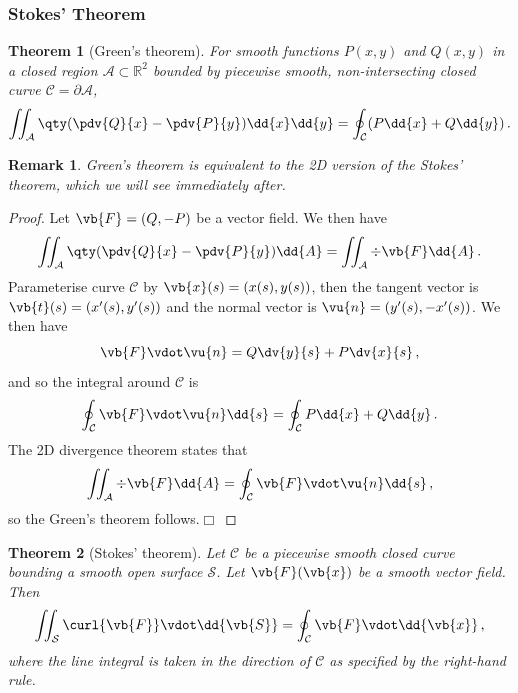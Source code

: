 \documentclass{article}
\theoremstyle{plain}\theoremheaderfont{\normalfont\itshape}\theorembodyfont{\rmfamily}\theoremseparator{.}\newtheorem*{rem}{Remark}\newtheorem*{ex}{Example}\newtheorem*{proof}{Proof}\newtheorem*{altp}{Alternative proof}
\theoremstyle{plain}\theoremheaderfont{\normalfont\bfseries}\theorembodyfont{\rmfamily}\theoremseparator{.}\newtheorem{thm}{Theorem}[section]\newtheorem{lem}[thm]{Lemma}\newtheorem{prop}[thm]{Proposition}\newtheorem*{cor}{Corollary}\newtheorem{defn}[thm]{Definition}\newtheorem{clm}[thm]{Claim}\newtheorem{clminproof}{Claim}
\theoremstyle{break}\theoremheaderfont{\normalfont\itshape}\theorembodyfont{\rmfamily}\theoremseparator{.\medskip}\newtheorem*{proofskip}{Proof}\newtheorem*{exs}{Examples}\newtheorem*{rems}{Remarks}
\theoremstyle{break}\theoremheaderfont{\normalfont\bfseries}\theorembodyfont{\rmfamily}\theoremseparator{.\medskip}\newtheorem{lemskip}[thm]{Lemma}\newtheorem{defnskip}[thm]{Definition}\newtheorem{propskip}[thm]{Proposition}\newtheorem{thmskip}[thm]{Theorem}
\numberwithin{equation}{section}
\newcommand{\qed}{\hfill\ensuremath{\Box}}
\begin{document}
	\subsubsection{Stokes' Theorem}	
	\begin{thm}[Green's theorem]	
		For smooth functions \(P(x,y)\) and \(Q(x,y)\) in a closed region \(\mathcal{A}\subset\mathbb{R}^2\) bounded by piecewise smooth, non-intersecting closed curve \(\mathcal{C}=\partial\mathcal{A}\),
		\[\iint_{\mathcal{A}}\qty(\pdv{Q}{x}-\pdv{P}{y})\dd{x}\dd{y}=\oint_{\mathcal{C}}(P\dd{x}+Q\dd{y})\,.\]
	\end{thm}
	\begin{rem}
		Green's theorem is equivalent to the 2D version of the Stokes' theorem, which we will see immediately after.
	\end{rem}
	\begin{proof}
		Let \(\vb{F}=(Q,-P)\) be a vector field. We then have
		\[\iint_\mathcal{A}\qty(\pdv{Q}{x}-\pdv{P}{y})\dd{A}=\iint_\mathcal{A}\div\vb{F}\dd{A}\,.\]
		Parameterise curve \(\mathcal{C}\) by \(\vb{x}(s)=(x(s),y(s))\), then the tangent vector is \(\vb{t}(s)=(x'(s),y'(s))\) and the normal vector is \(\vu{n}=(y'(s),-x'(s))\). We then have
		\[\vb{F}\vdot\vu{n}=Q\dv{y}{s}+P\dv{x}{s}\,,\]
		and so the integral around \(\mathcal{C}\) is
		\[\oint_\mathcal{C}\vb{F}\vdot\vu{n}\dd{s}=\oint_\mathcal{C}P\dd{x}+Q\dd{y}\,.\]
		The 2D divergence theorem states that
		\[\iint_\mathcal{A}\div\vb{F}\dd{A}=\oint_\mathcal{C}\vb{F}\vdot\vu{n}\dd{s}\,,\]
		so the Green's theorem follows.\qed
	\end{proof}
	\begin{thm}[Stokes' theorem]\label{stokesthm}
		Let \(\mathcal{C}\) be a piecewise smooth closed curve bounding a smooth open surface \(\mathcal{S}\). Let \(\vb{F}(\vb{x})\) be a smooth vector field. Then
		\[\iint_{\mathcal{S}}\curl{\vb{F}}\vdot\dd{\vb{S}}=\oint_{\mathcal{C}}\vb{F}\vdot\dd{\vb{x}}\,,\]
		where the line integral is taken in the direction of \(\mathcal{C}\) as specified by the right-hand rule.
	\end{thm}
\end{document}
